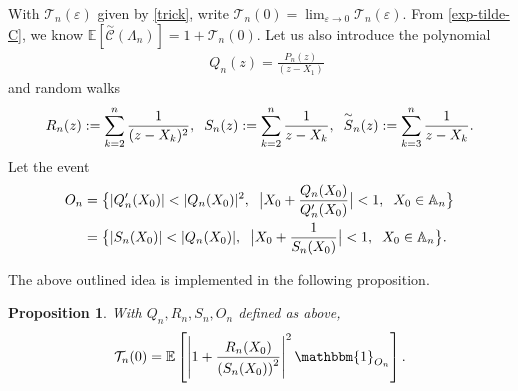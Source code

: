 \documentclass[9pt,a4paper,reqno]{amsart}
\newcommand{\tildea}[1]{\overset{\sim}{#1}}
\theoremstyle{mine}
\newtheorem{prop}[thm]{Proposition}
\theoremstyle{definition}
\theoremstyle{remark}
\renewcommand\epsilon{\varepsilon}
\newcommand{\mb}{\mathbb}
\begin{document}
With $\mathcal{T}_n(\epsilon)$ given by \eqref{trick}, write $\mathcal{T}_n(0) = \lim_{\epsilon \to 0} \mathcal{T}_n(\epsilon)$. From \eqref{exp-tilde-C}, we know $ \mb{E}[\tildea{\mathscr{C}}(\Lambda_n)] = 1 + \mathcal{T}_n(0)$. Let us also introduce the polynomial
\begin{align}\label{Qpolynomial}
    \quad Q_n(z)= \frac{P_n(z)}{(z-X_1)} 
\end{align}
and random walks 
\begin{align}\label{RW-Def}
     R_n(z) := \sum_{k=2}^n \frac{1}{(z-X_k)^2}, \hspace{2mm}S_n(z) := \sum_{k=2}^n \frac{1}{z-X_k}, \hspace{2mm}\tildea{S}_n(z) := \sum_{k=3}^n \frac{1}{z-X_k}. 
\end{align}
Let the event 
\begin{align}\label{definition of O_n}
    O_n &=  \bigl\{|Q_n'(X_0)| < |Q_n(X_0)|^2, \hspace{2mm}\bigl|X_0 + \frac{Q_n(X_0)}{Q_n'(X_0)}\bigr| <1, \hspace{2mm}X_0 \in \mb{A}_n\bigr\}\\ &= \bigl\{|S_n(X_0)| < |Q_n(X_0)|, \hspace{2mm}\bigl|X_0 + \frac{1}{S_n(X_0)}\bigr| <1, \hspace{2mm}X_0 \in \mb{A}_n\bigr\}.\nonumber
\end{align}

The above outlined idea is implemented in the following proposition. 

\begin{prop} \label{key-prop} With $Q_n, R_n, S_n, O_n$ defined as above, 
\begin{equation}\label{T(0)=nice}
    \mathcal{T}_n(0) = \mathbb{E}\left[ \left| 1 + 
    \frac{R_n(X_0)}
         { \left(S_n(X_0)\right)^2 }
    \right|^2 \mathbbm{1}_{O_n}\right]. 
\end{equation} 
\end{prop}
\end{document}
